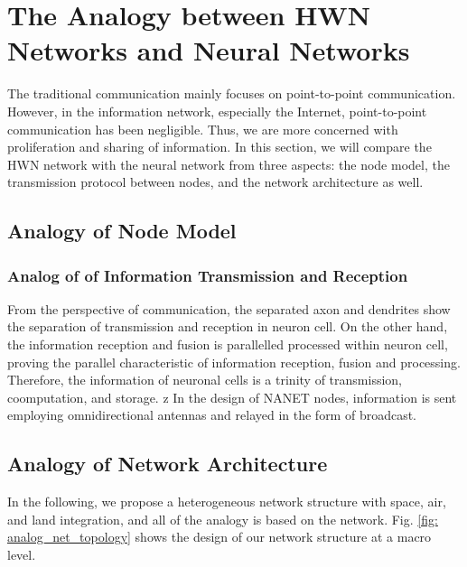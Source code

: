 \documentclass[journal,comsoc]{IEEEtran}
\begin{document}
	\section{The Analogy between HWN Networks and Neural Networks}
	\label{section: analogy}
	The traditional communication mainly focuses on point-to-point communication.
	However, in the information network, especially the Internet, point-to-point communication has been negligible. 
	Thus, we are more concerned with proliferation and sharing of information.
	In this section, we will compare the HWN network with the neural network from three aspects: the node model, the transmission protocol between nodes, and the network architecture as well.
	
	\subsection{Analogy of Node Model}
	\label{subsec: analogy_of_node_model}
	
	\subsubsection{Analog of of Information Transmission and Reception}
	From the perspective of communication, the separated axon and dendrites show the separation of transmission and reception in neuron cell. 
	On the other hand, the information reception and fusion is parallelled processed within neuron cell, proving the parallel characteristic of information reception, fusion and processing.
	Therefore, the information of neuronal cells is a trinity of transmission, coomputation, and storage.
	z
	In the design of NANET nodes, information is sent employing omnidirectional antennas and relayed in the form of broadcast. 
	
	\subsection{Analogy of Network Architecture}
	
	In the following, we propose a heterogeneous network structure with space, air, and land integration, and all of the analogy is based on the network.
	Fig. \ref{fig: analog_net_topology} shows the design of our network structure at a macro level.
\end{document}
